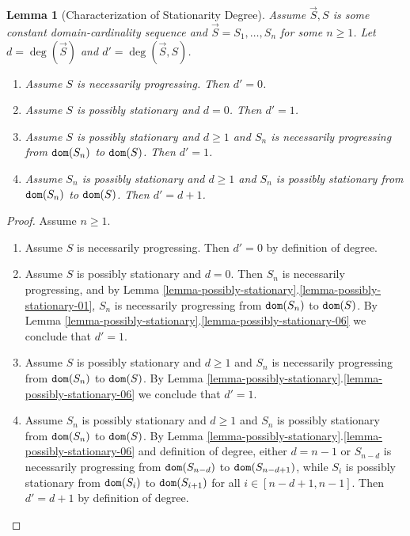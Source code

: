 \documentclass{lmcs}
\newtheorem{lemma}[theorem]{Lemma}
\begin{document}
\begin{lemma}[Characterization of Stationarity Degree]
\label{lemma-degree}
Assume $\vec{S},S$ is some constant domain-cardinality sequence
and $\vec{S} = S_1, \ldots, S_n$ for some $n \ge 1$. 
Let $d = \deg(\vec{S})$ and $d' = \deg(\vec{S},S)$.

\begin{enumerate}

\item
\label{lemma-degree-01}
Assume $S$ is necessarily progressing.
Then $d'=0$.

\item
\label{lemma-degree-02}
Assume $S$ is possibly stationary and $d=0$.
Then $d'=1$.

\item
\label{lemma-degree-03}
Assume $S$ is possibly stationary and $d \ge 1$ and $S_{n}$ is necessarily progressing
from ${\tt dom}(S_{n})$ to  ${\tt dom}(S)$. Then $d'=1$.

\item
\label{lemma-degree-04}
Assume $S_n$ is possibly stationary and $d \ge 1$ and $S_{n}$ is possibly stationary
from ${\tt dom}(S_{n})$ to  ${\tt dom}(S)$. Then $d' = d+1$.

\end{enumerate}
\end{lemma}

\begin{proof}
Assume $n \ge 1$. 

\begin{enumerate}

\item
Assume $S$ is necessarily progressing.
Then $d'=0$ by definition of degree.

\item
Assume $S$ is possibly stationary and $d=0$. Then $S_n$ is necessarily progressing,
and by Lemma \ref{lemma-possibly-stationary}.\ref{lemma-possibly-stationary-01}, 
$S_n$ is necessarily progressing from ${\tt dom}(S_n)$ to ${\tt dom}(S)$. 
By Lemma \ref{lemma-possibly-stationary}.\ref{lemma-possibly-stationary-06} 
we conclude that $d'=1$.

\item
Assume $S$ is possibly stationary and $d \ge 1$ and $S_{n}$ is necessarily progressing
from ${\tt dom}(S_{n})$ to  ${\tt dom}(S)$. 
By Lemma \ref{lemma-possibly-stationary}.\ref{lemma-possibly-stationary-06} 
we conclude that $d'=1$.

\item
Assume $S_n$ is possibly stationary and $d \ge 1$ and $S_n$ is possibly stationary
from ${\tt dom}(S_{n})$ to  ${\tt dom}(S)$. 
By Lemma \ref{lemma-possibly-stationary}.\ref{lemma-possibly-stationary-06}
and definition of degree, either $d=n-1$ or $S_{n-d}$ is necessarily progressing
from ${\tt dom}(S_{n-d})$ to ${\tt dom}(S_{n-d+1})$, while $S_{i}$ is possibly stationary
from ${\tt dom}(S_{i})$ to ${\tt dom}(S_{i+1})$ for all $i \in [n-d+1,n-1]$. Then $d'=d+1$ by
definition of degree.

\end{enumerate}
\end{proof}
\end{document}
